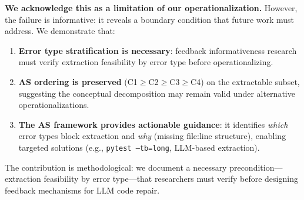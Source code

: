 \textbf{We acknowledge this as a limitation of our operationalization.} However, the failure is informative: it reveals a boundary condition that future work must address. We demonstrate that:

\begin{enumerate}
    \item \textbf{Error type stratification is necessary}: feedback informativeness research must verify extraction feasibility by error type before operationalizing.
    \item \textbf{AS ordering is preserved} (C1$\geq$C2$\geq$C3$\geq$C4) on the extractable subset, suggesting the conceptual decomposition may remain valid under alternative operationalizations.
    \item \textbf{The AS framework provides actionable guidance}: it identifies \emph{which} error types block extraction and \emph{why} (missing file:line structure), enabling targeted solutions (e.g., \texttt{pytest --tb=long}, LLM-based extraction).
\end{enumerate}

The contribution is methodological: we document a necessary precondition---extraction feasibility by error type---that researchers must verify before designing feedback mechanisms for LLM code repair.

